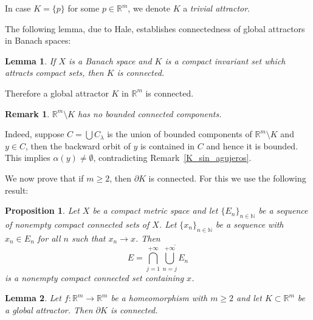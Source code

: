 \documentclass{amsart}
\newtheorem{rmk}{Remark}
\newtheorem{prop}{Proposition}
\newtheorem{lemma}{Lemma}
\newcommand{\R}{{\mathbb{R}}}
\newcommand{\N}{{\mathbb{N}}}
\begin{document}
	In case $K=\{p\}$ for some $p\in \R^m$, we denote $K$ a \emph{trivial  attractor}.  
	
	The following lemma, due to Hale, establishes connectedness of global attractors in Banach spaces:
	
	\begin{lemma}\cite{Ha88}\label{K_conexo}
		If $X$ is a Banach space and $K$ is a compact invariant set which attracts compact sets, then $K$ is connected.
	\end{lemma}
	
	Therefore a  global attractor $K$ in $\R^m$ is connected.  
	
	\begin{rmk}\label{no_agujeros} $\R^m\setminus K$ has no bounded connected components.
	\end{rmk}
		Indeed, suppose $C=\bigcup C_\lambda$ is the union of bounded components of $\R^m\setminus K$ and $y\in C$, then the backward orbit of $y$ is contained in $C$ and hence it is bounded. This  implies $\alpha(y)\neq \emptyset$, contradicting Remark~\ref{K_sin_agujeros}.
	
	
	
	
	We now prove that if $m\geq2$, then $\partial K$ is connected. For this we use the following result:
	
	\begin{prop}\label{interseccion_comp_conexo}
	Let $X$ be a compact metric space and let $\{E_n\}_{n\in \N}$ be a sequence of nonempty compact connected sets of $X$.  
		Let $\{x_n\}_{n\in \N}$ be a sequence with $x_n\in E_n$ for all $n$ such that  $x_n\to x$.  
		Then
		\[
		E=\bigcap_{j=1}^{+\infty} \overline{\bigcup_{n=j}^{+\infty} E_n}
		\]
		is a nonempty compact connected set containing $x$.
	\end{prop}
	
	\begin{lemma}\label{partial_K_conexo} 
		Let $f:\R^m\to \R^m$ be a homeomorphism with $m\geq 2$ and let $K\subset\R^m$ be a  global attractor. Then $\partial K$ is connected.
	\end{lemma}
	
\end{document}
